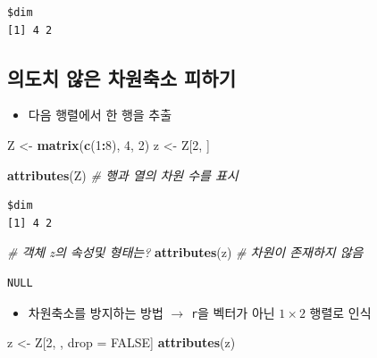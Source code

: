 \documentclass[
  11pt,
]{krantz}
\newenvironment{Shaded}{\begin{snugshade}}{\end{snugshade}}
\newcommand{\CommentTok}[1]{\textcolor[rgb]{0.37,0.37,0.37}{\textit{#1}}}
\newcommand{\DecValTok}[1]{\textcolor[rgb]{0.06,0.06,0.06}{#1}}
\newcommand{\KeywordTok}[1]{\textcolor[rgb]{0.27,0.27,0.27}{\textbf{#1}}}
\newcommand{\NormalTok}[1]{#1}
\newcommand{\OperatorTok}[1]{\textcolor[rgb]{0.43,0.43,0.43}{\textbf{#1}}}
\newcommand{\OtherTok}[1]{\textcolor[rgb]{0.37,0.37,0.37}{#1}}
\newcommand{\StringTok}[1]{\textcolor[rgb]{0.5,0.5,0.5}{#1}}
\providecommand{\tightlist}{%
  \setlength{\itemsep}{0pt}\setlength{\parskip}{0pt}}
\begin{document}
\begin{verbatim}
$dim
[1] 4 2
\end{verbatim}

\normalsize

\hypertarget{mat-dim-reduc-sway}{%
\subsection{의도치 않은 차원축소 피하기}\label{mat-dim-reduc-sway}}

\begin{itemize}
\tightlist
\item
  다음 행렬에서 한 행을 추출
\end{itemize}

\footnotesize

\begin{Shaded}
\begin{Highlighting}[]
\NormalTok{Z <-}\StringTok{ }\KeywordTok{matrix}\NormalTok{(}\KeywordTok{c}\NormalTok{(}\DecValTok{1}\OperatorTok{:}\DecValTok{8}\NormalTok{), }\DecValTok{4}\NormalTok{, }\DecValTok{2}\NormalTok{)}
\NormalTok{z <-}\StringTok{ }\NormalTok{Z[}\DecValTok{2}\NormalTok{, ]}

\KeywordTok{attributes}\NormalTok{(Z) }\CommentTok{# 행과 열의 차원 수를 표시}
\end{Highlighting}
\end{Shaded}

\begin{verbatim}
$dim
[1] 4 2
\end{verbatim}

\begin{Shaded}
\begin{Highlighting}[]
\CommentTok{# 객체 z의 속성및 형태는? }
\KeywordTok{attributes}\NormalTok{(z) }\CommentTok{# 차원이 존재하지 않음}
\end{Highlighting}
\end{Shaded}

\begin{verbatim}
NULL
\end{verbatim}

\normalsize

\begin{itemize}
\tightlist
\item
  차원축소를 방지하는 방법 \(\rightarrow\) \texttt{r}을 벡터가 아닌 \(1 \times 2\) 행렬로 인식
\end{itemize}

\footnotesize

\begin{Shaded}
\begin{Highlighting}[]
\NormalTok{z <-}\StringTok{ }\NormalTok{Z[}\DecValTok{2}\NormalTok{, , drop =}\StringTok{ }\OtherTok{FALSE}\NormalTok{]}
\KeywordTok{attributes}\NormalTok{(z)}
\end{Highlighting}
\end{Shaded}
\end{document}
